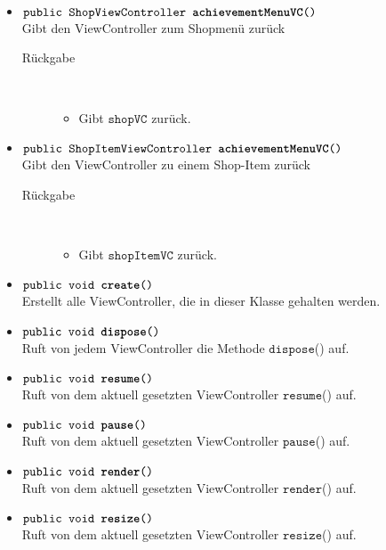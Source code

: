 \begin{description}
\begin{itemize}
		\item $\texttt{public ShopViewController \textbf{achievementMenuVC}()}$ \\ Gibt den ViewController zum Shopmenü zurück
		\begin{description}
			\item[Rückgabe] \hfill \\
			\vspace{-.8cm}
			\begin{itemize}
				\item Gibt $\texttt{shopVC}$ zurück.
			\end{itemize}
			\end{description}
			
		\item $\texttt{public ShopItemViewController \textbf{achievementMenuVC}()}$ \\ Gibt den ViewController zu einem Shop-Item zurück
			\begin{description}
			\item[Rückgabe] \hfill \\
			\vspace{-.8cm}
			\begin{itemize}
				\item Gibt $\texttt{shopItemVC}$ zurück.
			\end{itemize}
			\end{description}

		\item $\texttt{public void \textbf{create}()}$ \\ Erstellt alle ViewController, die in dieser Klasse gehalten werden.
		\item $\texttt{public void \textbf{dispose}()}$ \\ Ruft von jedem ViewController die Methode $\texttt{dispose}$() auf.
		\item $\texttt{public void \textbf{resume}()}$ \\ Ruft von dem aktuell gesetzten ViewController $\texttt{resume}$() auf.
		\item $\texttt{public void \textbf{pause}()}$ \\ Ruft von dem aktuell gesetzten ViewController $\texttt{pause}$() auf.
		\item $\texttt{public void \textbf{render}()}$ \\ Ruft von dem aktuell gesetzten ViewController $\texttt{render}$() auf.
		\item $\texttt{public void \textbf{resize}()}$ \\ Ruft von dem aktuell gesetzten ViewController $\texttt{resize}$() auf.
		

			

		\end{itemize}
	\end{description}
